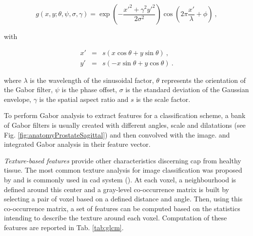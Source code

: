 \begin{enumerate}[leftmargin=*]
\begin{equation}
	g(x,y;\theta,\psi,\sigma,\gamma) = \exp \left( - \frac{x'^{2}+ \gamma^{2}y'^{2}}{2 \sigma^{2}} \right) \cos \left( 2 \pi \frac{x'}{\lambda} + \phi \right) \ ,
\end{equation}

\noindent with 

\begin{eqnarray}
	x' & = & s\left( x \cos \theta + y \sin \theta \right) \ , \nonumber \\
	y' & = & s \left( - x \sin \theta + y \cos \theta \right) \ . \nonumber
\end{eqnarray}

\noindent where $\lambda$ is the wavelength of the sinusoidal factor, $\theta$ represents the orientation of the Gabor filter, $\psi$ is the phase offset, $\sigma$ is the standard deviation of the Gaussian envelope, $\gamma$ is the spatial aspect ratio and $s$ is the scale factor.

To perform Gabor analysis to extract features for a classification scheme, a bank of Gabor filters is usually created with different angles, scale and dilatations (see Fig. \ref{fig:anatomyProstateSagittal}) and then convolved with the image. \cite{Viswanath2008a,Viswanath2012} and \cite{Tiwari2012} integrated Gabor analysis in their feature vector.

\textit{Texture-based features} provide other characteristics discerning \ac{cap} from healthy tissue. The most common texture analysis for image classification was proposed by \cite{Haralick1973} and is commonly used in \ac{cad} system (\cite{Antic2013,Niaf2011,Niaf2012,Tiwari2009a,Tiwari2010,Tiwari2013,Viswanath2008,Viswanath2008a,Viswanath2011,Viswanath2012}). At each voxel, a neighbourhood is defined around this center and a gray-level co-occurrence matrix is built by selecting a pair of voxel based on a defined distance and angle. Then, using this co-occurrence matrix, a set of features can be computed based on the statistics intending to describe the texture around each voxel. Computation of these features are reported in Tab. \ref{tab:glcm}.


\end{enumerate}
